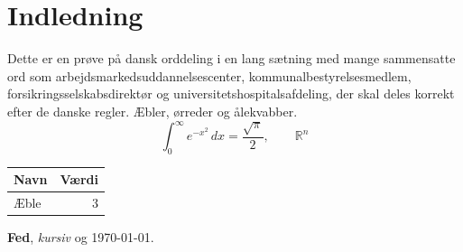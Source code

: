 \documentclass[a4paper,11pt]{article}
\begin{document}
\section{Indledning}
Dette er en prøve på dansk orddeling i en lang sætning med mange
sammensatte ord som arbejdsmarkedsuddannelsescenter, kommunalbestyrelsesmedlem,
forsikringsselskabsdirektør og universitetshospitalsafdeling, der skal deles
korrekt efter de danske regler. Æbler, ørreder og ålekvabber.
\begin{equation}
  \int_0^\infty e^{-x^2}\,dx = \frac{\sqrt{\pi}}{2}, \qquad \mathbb{R}^n
\end{equation}
\begin{center}
\end{center}
\begin{tabular}{lr}\toprule Navn & Værdi\\\midrule Æble & 3\\\bottomrule\end{tabular}

\textbf{Fed}, \textit{kursiv} og \today.
\end{document}
